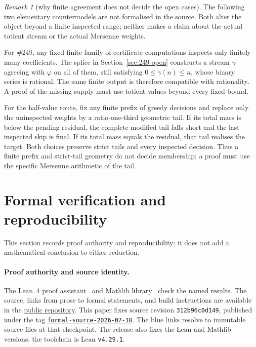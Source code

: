 \documentclass[11pt]{article}
\newcommand{\commitshort}{312b96c0d149}
\theoremstyle{definition}
\theoremstyle{remark}
\newtheorem*{remark}{Remark}
\newcommand{\ph}{\varphi}
\begin{document}
\begin{remark}[why finite agreement does not decide the open cases]
The following two elementary countermodels are not formalised in the source.
Both alter the object beyond a finite inspected range; neither makes a claim
about the actual totient stream or the actual Mersenne weights.

For \#249, any fixed finite family of certificate computations inspects only
finitely many coefficients.  The splice in Section~\ref{sec:249-open}
constructs a stream \(\gamma\) agreeing with \(\ph\) on all of them, still
satisfying \(0\leq\gamma(n)\leq n\), whose binary series is rational.  The
same finite output is therefore compatible with rationality.  A proof of the
missing supply must use totient values beyond every fixed bound.

For the half-value route, fix any finite prefix of greedy decisions and
replace only the uninspected weights by a ratio-one-third geometric tail.
If its total mass is below the pending residual, the complete modified tail
falls short and the last inspected skip is final.  If its total mass equals
the residual, that tail realises the target.  Both choices preserve strict
tails and every inspected decision.  Thus a finite prefix and strict-tail
geometry do not decide membership; a proof must use the specific Mersenne
arithmetic of the tail.
\end{remark}

\section{Formal verification and reproducibility}\label{sec:verify}

\noindent This section records proof authority and reproducibility; it does
not add a mathematical conclusion to either reduction.

\paragraph{Proof authority and source identity.}
The Lean~4 proof assistant~\cite{lean} and Mathlib library~\cite{mathlib} check
the named results.  The source, links from prose to formal statements, and build
instructions are available in the
\href{https://github.com/wcook04/plectis-lean-erdos249-257}{public repository}.
This paper fixes source revision \texttt{\commitshort}, published under
the tag
\href{https://github.com/wcook04/plectis-lean-erdos249-257/tree/formal-source-2026-07-18}{\texttt{formal-source-2026-07-18}}.
The blue links resolve to immutable source files at that checkpoint.
The release also fixes the Lean and Mathlib
versions; the toolchain is Lean \texttt{v4.29.1}.
\end{document}
